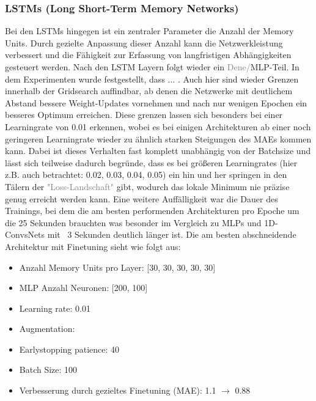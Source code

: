 \documentclass[manuscript,screen,review]{acmart}
\begin{document}

\subsubsection*{LSTMs (Long Short-Term Memory Networks)}
Bei den LSTMs hingegen ist ein zentraler Parameter die Anzahl der Memory Units. Durch gezielte Anpassung dieser Anzahl kann die Netzwerkleistung verbessert und die Fähigkeit zur Erfassung von langfristigen Abhängigkeiten gesteuert werden. Nach den LSTM Layern folgt wieder ein \textcolor{gray}{Dene/}MLP-Teil. 
In dem Experimenten wurde festgestellt, dass ... .
Auch hier sind wieder Grenzen innerhalb der Gridsearch auffindbar, ab denen die Netzwerke mit deutlichem Abstand bessere Weight-Updates vornehmen und nach nur wenigen Epochen ein besseres Optimum erreichen. Diese grenzen lassen sich besonders bei einer Learningrate von 0.01 erkennen, wobei es bei einigen Architekturen ab einer noch geringeren Learningrate wieder zu ähnlich starken Steigungen des MAEs kommen kann. Dabei ist dieses Verhalten fast komplett unabhängig von der Batchsize und lässt sich teilweise dadurch begründe, dass es bei größeren Learningrates (hier z.B. auch betrachtet: 0.02, 0.03, 0.04, 0.05) ein hin und her springen in den Tälern der \textcolor{gray}{"Loss-Landschaft"} gibt, wodurch das lokale Minimum nie präzise genug erreicht werden kann.
Eine weitere Auffälligkeit war die Dauer des Trainings, bei dem die am besten performenden Architekturen pro Epoche um die 25 Sekunden brauchten was besonder im Vergleich zu MLPs und 1D-ConvsNets mit ~3 Sekunden deutlich länger ist. 
Die am besten abschneidende Architektur mit Finetuning sieht wie folgt aus:
\begin{itemize}
    \item Anzahl Memory Units pro Layer: [30, 30, 30, 30, 30]
    \item MLP Anzahl Neuronen: [200, 100]
    \item Learning rate: 0.01
    \item Augmentation: 
    \item Earlystopping patience: 40
    \item Batch Size: 100
    \item Verbesserung durch gezieltes Finetuning (MAE): 1.1 $\rightarrow$ 0.88
\end{itemize}
\end{document}
